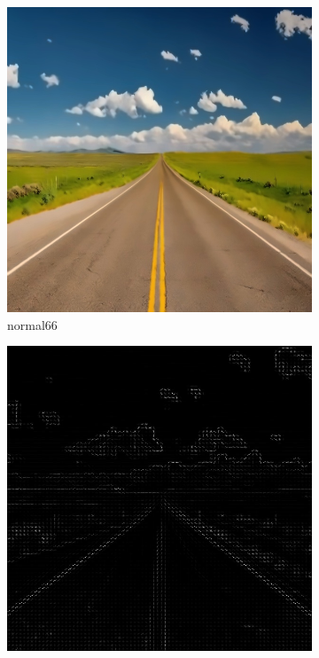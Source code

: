 \documentclass[a4paper, 10pt]{article}
\begin{document}
	
	\begin{figure}[htbp] 
		\centering 
		
		\begin{subfigure}{0.24\textwidth}
			\includegraphics[width=\linewidth]{picture/alldata/normal66}
			\caption{normal66}
			\label{fig: normal66}	
		\end{subfigure}
		\begin{subfigure}{0.24\textwidth}
			\includegraphics[width=\linewidth]{picture/alldata_hog/normal66}

\end{subfigure}
\end{figure}
\end{document}

